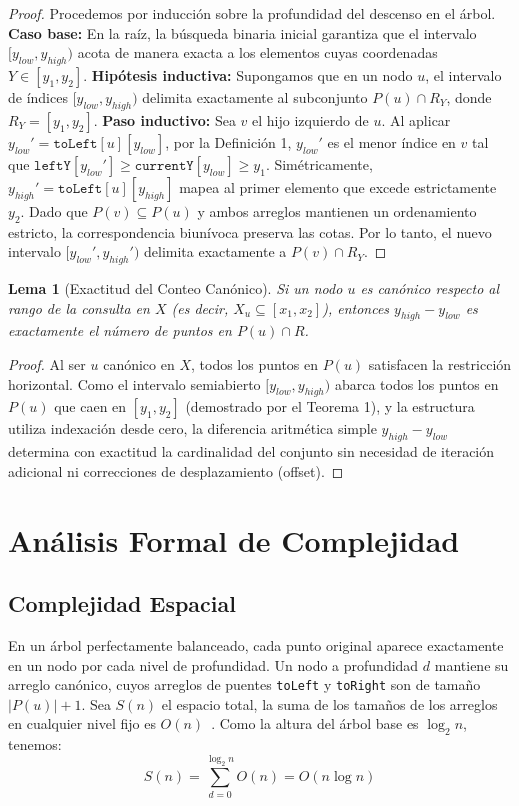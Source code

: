 \documentclass[10pt,twocolumn,a4paper]{article}
\newtheorem{lemma}{Lema}
\begin{document}
\begin{proof}
Procedemos por inducción sobre la profundidad del descenso en el árbol.
\textbf{Caso base:} En la raíz, la búsqueda binaria inicial garantiza que el intervalo $[y_{low}, y_{high})$ acota de manera exacta a los elementos cuyas coordenadas $Y \in [y_1, y_2]$.
\textbf{Hipótesis inductiva:} Supongamos que en un nodo $u$, el intervalo de índices $[y_{low}, y_{high})$ delimita exactamente al subconjunto $P(u) \cap R_Y$, donde $R_Y = [y_1, y_2]$.
\textbf{Paso inductivo:} Sea $v$ el hijo izquierdo de $u$. Al aplicar $y_{low}' = \texttt{toLeft}[u][y_{low}]$, por la Definición 1, $y_{low}'$ es el menor índice en $v$ tal que $\texttt{leftY}[y_{low}'] \ge \texttt{currentY}[y_{low}] \ge y_1$. Simétricamente, $y_{high}' = \texttt{toLeft}[u][y_{high}]$ mapea al primer elemento que excede estrictamente $y_2$. Dado que $P(v) \subseteq P(u)$ y ambos arreglos mantienen un ordenamiento estricto, la correspondencia biunívoca preserva las cotas. Por lo tanto, el nuevo intervalo $[y_{low}', y_{high}')$ delimita exactamente a $P(v) \cap R_Y$.
\end{proof}

\begin{lemma}[Exactitud del Conteo Canónico]
Si un nodo $u$ es canónico respecto al rango de la consulta en $X$ (es decir, $X_u \subseteq [x_1, x_2]$), entonces $y_{high} - y_{low}$ es exactamente el número de puntos en $P(u) \cap R$.
\end{lemma}

\begin{proof}
Al ser $u$ canónico en $X$, todos los puntos en $P(u)$ satisfacen la restricción horizontal. Como el intervalo semiabierto $[y_{low}, y_{high})$ abarca todos los puntos en $P(u)$ que caen en $[y_1, y_2]$ (demostrado por el Teorema 1), y la estructura utiliza indexación desde cero, la diferencia aritmética simple $y_{high} - y_{low}$ determina con exactitud la cardinalidad del conjunto sin necesidad de iteración adicional ni correcciones de desplazamiento (offset).
\end{proof}

\section{Análisis Formal de Complejidad}

\subsection{Complejidad Espacial}
En un árbol perfectamente balanceado, cada punto original aparece exactamente en un nodo por cada nivel de profundidad. Un nodo a profundidad $d$ mantiene su arreglo canónico, cuyos arreglos de puentes \texttt{toLeft} y \texttt{toRight} son de tamaño $|P(u)| + 1$. 
Sea $S(n)$ el espacio total, la suma de los tamaños de los arreglos en cualquier nivel fijo es $O(n)$~\cite{deberg}. Como la altura del árbol base es $\log_2 n$, tenemos:
\begin{equation}\label{eq:espacio}
S(n) = \sum_{d=0}^{\log_2 n} O(n) = O(n \log n)
\end{equation}
\end{document}
